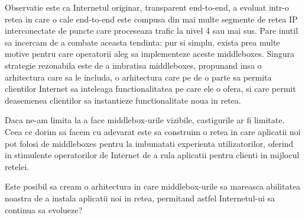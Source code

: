 Observatie este ca Internetul originar, transparent end-to-end, a
evoluat intr-o retea in care o cale end-to-end este compusa din mai
multe segmente de retea IP interconectate de puncte care proceseaza
trafic la nivel 4 sau mai sus.  Pare inutil sa incercam de a combate
aceasta tendinta: pur si simplu, exista prea multe motive pentru care
operatorii aleg sa implementeze aceste middleboxes. Singura strategie
rezonabila este de a imbratisa middleboxes, propunand insa o
arhitectura care sa le includa, o arhitectura care pe de o parte sa
permita clientilor Internet sa inteleaga functionalitatea pe care ele
o ofera, si care permit deasemenea clientilor sa instantieze
functionalitate noua in retea.

Daca ne-am limita la a face middlebox-urile vizibile, castigurile ar
fi limitate. Ceea ce dorim sa facem cu adevarat este sa construim o
retea in care aplicatii noi pot folosi de middleboxes pentru la
imbunatati experienta utilizatorilor, oferind in stimulente
operatorilor de Internet de a rula aplicatii pentru clienti in
mijlocul retelei.

Este posibil sa cream o arhitectura in care middlebox-urile sa
mareasca abilitatea noastra de a instala aplicatii noi in retea,
permitand astfel Internetul-ui sa continua sa evolueze?


